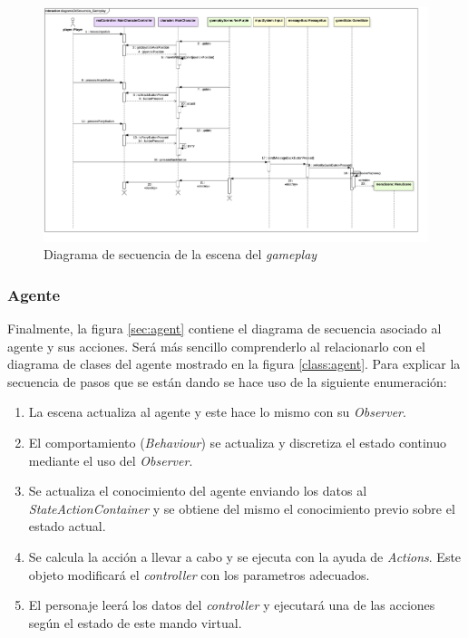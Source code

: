 \begin{figure}
	\centerline{\includegraphics[width=19cm]{otros/UML/png/alld/png/CasosDeUso__Especifico__Collaboration2__Interaction1__diagramaDeSecuencia_Gameplay_18.png}}
	\caption{Diagrama de secuencia de la escena del \textit{gameplay}}
	\label{sec:gameplay}
\end{figure}


\subsubsection*{Agente}


Finalmente, la figura \ref{sec:agent} contiene el diagrama de secuencia asociado al agente y sus acciones. Será más sencillo comprenderlo al relacionarlo con el diagrama de clases del agente mostrado en la figura \ref{class:agent}. Para explicar la secuencia de pasos que se están dando se hace uso de la siguiente enumeración:

\begin{enumerate}
	\item La escena actualiza al agente y este hace lo mismo con su \textit{Observer}.
	\item El comportamiento (\textit{Behaviour}) se actualiza y discretiza el estado continuo mediante el uso del \textit{Observer}.
	\item Se actualiza el conocimiento del agente enviando los datos al \textit{StateActionContainer} y se obtiene del mismo el conocimiento previo sobre el estado actual.
	\item Se calcula la acción a llevar a cabo y se ejecuta con la ayuda de \textit{Actions}. Este objeto modificará el \textit{controller} con los parametros adecuados.
	\item El personaje leerá los datos del \textit{controller} y ejecutará una de las acciones según el estado de este mando virtual.
\end{enumerate}

